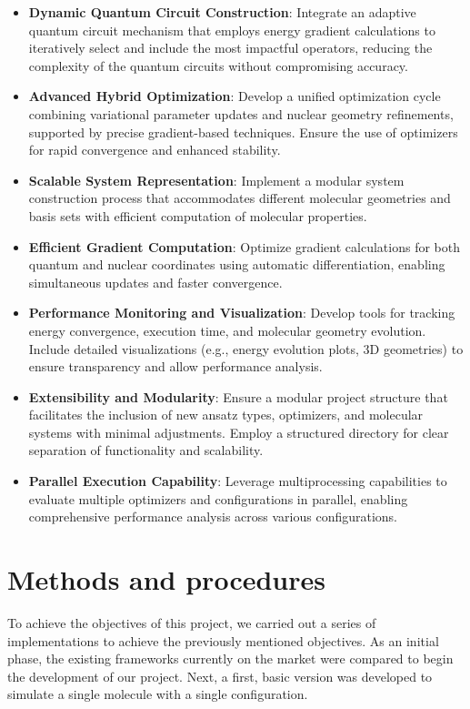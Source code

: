 \begin{itemize}
  \item \textbf{Dynamic Quantum Circuit Construction}: Integrate an adaptive quantum circuit mechanism that employs energy gradient calculations to iteratively select and include the most impactful operators, reducing the complexity of the quantum circuits without compromising accuracy.
  \item \textbf{Advanced Hybrid Optimization}: Develop a unified optimization cycle combining variational parameter updates and nuclear geometry refinements, supported by precise gradient-based techniques. Ensure the use of optimizers for rapid convergence and enhanced stability.
  \item \textbf{Scalable System Representation}: Implement a modular system construction process that accommodates different molecular geometries and basis sets with efficient computation of molecular properties.
  \item \textbf{Efficient Gradient Computation}: Optimize gradient calculations for both quantum and nuclear coordinates using automatic differentiation, enabling simultaneous updates and faster convergence.
  \item \textbf{Performance Monitoring and Visualization}: Develop tools for tracking energy convergence, execution time, and molecular geometry evolution. Include detailed visualizations (e.g., energy evolution plots, 3D geometries) to ensure transparency and allow performance analysis.
  \item \textbf{Extensibility and Modularity}: Ensure a modular project structure that facilitates the inclusion of new ansatz types, optimizers, and molecular systems with minimal adjustments. Employ a structured directory for clear separation of functionality and scalability.
  \item \textbf{Parallel Execution Capability}: Leverage multiprocessing capabilities to evaluate multiple optimizers and configurations in parallel, enabling comprehensive performance analysis across various configurations.
\end{itemize}


\section{Methods and procedures}
To achieve the objectives of this project, we carried out a series of implementations to achieve the previously mentioned objectives. As an initial phase, the existing frameworks currently on the market were compared to begin the development of our project. Next, a first, basic version was developed to simulate a single molecule with a single configuration.

